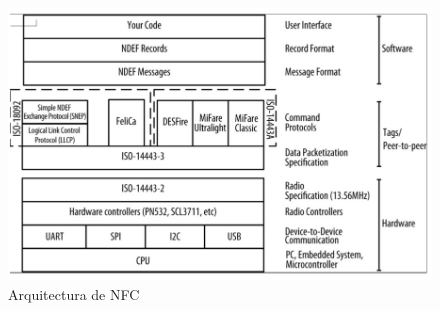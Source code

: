 \documentclass[11pt,openany]{book}
\begin{document}
	\begin{figure}[htb]
			\centering
			\includegraphics[width=1\textwidth]{imagenes/arquitectura_nfc.PNG}
			\caption{Arquitectura de NFC}
			\label{Arquitectura_de_NFC}
	\end{figure}
\end{document}

